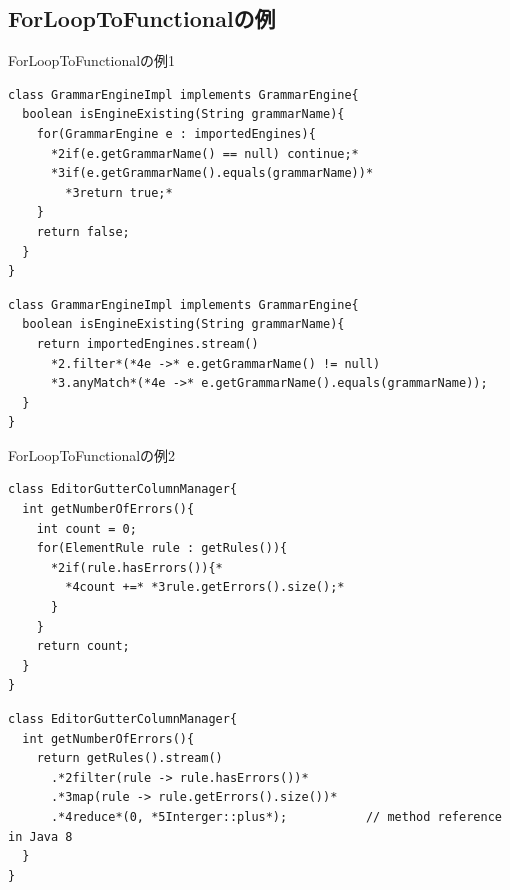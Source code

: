 \subsection{ForLoopToFunctionalの例}
\begin{frame}[fragile]{ForLoopToFunctionalの例1}

\begin{lstlisting}[moredelim={**[is][{\btHL<2>}]{*2}{*}},
  moredelim={**[is][{\btHL<3>}]{*3}{*}},
  moredelim={**[is][{\btHL<4>}]{*4}{*}}]
class GrammarEngineImpl implements GrammarEngine{
  boolean isEngineExisting(String grammarName){
    for(GrammarEngine e : importedEngines){
      *2if(e.getGrammarName() == null) continue;*
      *3if(e.getGrammarName().equals(grammarName))*
        *3return true;*
    }
    return false;
  }
}
\end{lstlisting}
\begin{lstlisting}[morekeywords={filter,stream,anyMatch,map,reduce,forEach},
  moredelim={**[is][{\btHL<2>}]{*2}{*}},
  moredelim={**[is][{\btHL<3>}]{*3}{*}},
  moredelim={**[is][{\btHL<4>}]{*4}{*}}]
class GrammarEngineImpl implements GrammarEngine{
  boolean isEngineExisting(String grammarName){
    return importedEngines.stream()
      *2.filter*(*4e ->* e.getGrammarName() != null)
      *3.anyMatch*(*4e ->* e.getGrammarName().equals(grammarName));
  }
}
\end{lstlisting}
\end{frame}
\begin{frame}[fragile]{ForLoopToFunctionalの例2}

\begin{lstlisting}[moredelim={**[is][{\btHL<2>}]{*2}{*}},
  moredelim={**[is][{\btHL<3>}]{*3}{*}},
  moredelim={**[is][{\btHL<4>}]{*4}{*}}]
class EditorGutterColumnManager{
  int getNumberOfErrors(){
    int count = 0;
    for(ElementRule rule : getRules()){
      *2if(rule.hasErrors()){*
        *4count +=* *3rule.getErrors().size();*
      }
    }
    return count;
  }
}
\end{lstlisting}
\begin{lstlisting}[morekeywords={filter,stream,anyMatch,map,reduce,forEach},
  moredelim={**[is][{\btHL<2>}]{*2}{*}},
  moredelim={**[is][{\btHL<3>}]{*3}{*}},
  moredelim={**[is][{\btHL<4>}]{*4}{*}},
  moredelim={**[is][{\btHL<5>}]{*5}{*}}]
class EditorGutterColumnManager{
  int getNumberOfErrors(){
    return getRules().stream()
      .*2filter(rule -> rule.hasErrors())*
      .*3map(rule -> rule.getErrors().size())*
      .*4reduce*(0, *5Interger::plus*);           // method reference in Java 8
  }
}
\end{lstlisting}
\end{frame}
